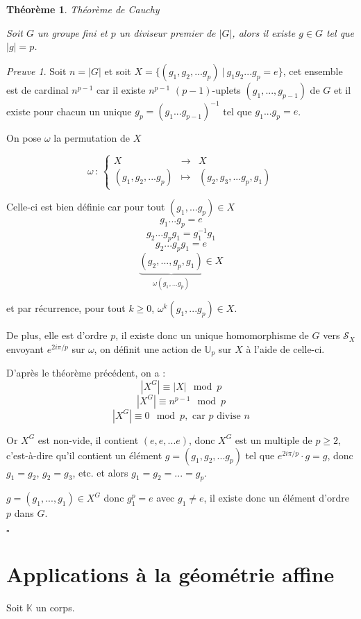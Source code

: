 \documentclass[]{article}
\newtheorem{mythm}{Théorème}
\theoremstyle{remark}
\newtheorem{myproof}{Preuve}
\theoremstyle{definition}
\newcommand{\cqfd}{
	\hfill$\square$
}
\newcommand{\func}[5]{
#1 \, : \, \left\{ \begin{array}{lcl}
	#2 & \longrightarrow & #3 \\
	#4 & \longmapsto & #5
\end{array}
\right.
}
\begin{document}
\begin{mythm}Théorème de Cauchy

	Soit $G$ un groupe fini et $p$ un diviseur premier de $|G|$, alors il existe $g \in G$ tel que $|g|=p$.
\end{mythm}

\begin{myproof}
	Soit $n = |G|$ et soit $X = \{(g_1, g_2, ...g_p) ~ | ~ g_1 g_2 ... g_p = e\}$, cet ensemble est de cardinal $n^{p-1}$ car il existe $n^{p-1}$ $(p-1)$-uplets $(g_1, ..., g_{p-1})$ de $G$ et il existe pour chacun un unique $g_p = (g_1...g_{p-1})^{-1}$ tel que $g_1...g_p = e$.
	
	On pose $\omega$ la permutation de $X$
	
	$$\func{\omega}{X}{X}{(g_1, g_2, ... g_p)}{(g_2, g_3, ... g_p, g_1)}$$
	
	Celle-ci est bien définie car pour tout $(g_1, ... g_p) \in X$
	$$g_1...g_p = e$$
	$$g_2...g_p g_1 = g_1^{-1} g_1$$
	$$g_2...g_p g_1 = e$$
	$$\underbrace{(g_2, ..., g_p, g_1)}_{\omega(g_1, ...g_p)} \in X$$
	
	et par récurrence, pour tout $k \geqslant 0$, $\omega^k (g_1, ...g_p) \in X$.
	
	De plus, elle est d'ordre $p$, il  existe donc un unique homomorphisme de $G$ vers $\mathcal{S}_X$ envoyant $e^{2 i \pi / p}$ sur $\omega$, on définit une action de $\mathbb{U}_p$ sur $X$ à l'aide de celle-ci.
	
	D'après le théorème précédent, on a :
	$$\left|X^G\right| \equiv |X| \mod p$$
	$$\left|X^G\right| \equiv n^{p-1} \mod p$$
	$$\left|X^G\right| \equiv 0 \mod p, \text{ car $p$ divise $n$}$$
	
	Or $X^G$ est non-vide, il contient $(e, e, ...e)$, donc $X^G$ est un multiple de $p \geqslant 2$, c'est-à-dire qu'il contient un élément $g=(g_1, g_2, ... g_p)$ tel que $e^{2 i \pi / p} \cdot g = g$, donc $g_1 = g_2$, $g_2 = g_3$, etc. et alors $g_1 = g_2 = ... = g_p$.
	
	$g=(g_1, ..., g_1) \in X^G$ donc $g_1^p = e$ avec $g_1 \neq e$, il existe donc un élément d'ordre $p$ dans $G$.
	
	\cqfd
\end{myproof}

\section{Applications à la géométrie affine}

Soit $\mathbb{K}$ un corps.
\end{document}
